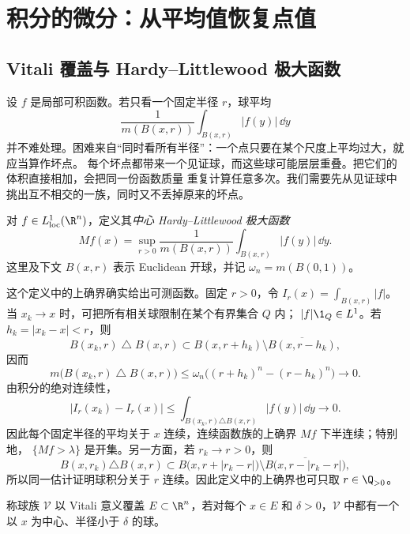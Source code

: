 \section{积分的微分：从平均值恢复点值}\label{sec:04-01}

\subsection{Vitali 覆盖与 Hardy--Littlewood 极大函数}\label{subsec:4-1-1}

设 $f$ 是局部可积函数。若只看一个固定半径 $r$，球平均
\[
  \frac{1}{m(B(x,r))}\int_{B(x,r)}|f(y)|\,\dd y
\]
并不难处理。困难来自“同时看所有半径”：一个点只要在某个尺度上平均过大，就应当算作坏点。
每个坏点都带来一个见证球，而这些球可能层层重叠。把它们的体积直接相加，会把同一份函数质量
重复计算任意多次。我们需要先从见证球中挑出互不相交的一族，同时又不丢掉原来的坏点。

\begin{definition}[中心极大函数]\label{def:4-1-1-1}
对 $f\in L^1_{\mathrm{loc}}(\R^n)$，定义其\emph{中心 Hardy--Littlewood 极大函数}
\[
  Mf(x)=\sup_{r>0}\frac{1}{m(B(x,r))}
                \int_{B(x,r)}|f(y)|\,\dd y .
\]
这里及下文 $B(x,r)$ 表示 Euclidean 开球，并记 $\omega_n=m(B(0,1))$。
\end{definition}

这个定义中的上确界确实给出可测函数。固定 $r>0$，令
$I_r(x)=\int_{B(x,r)}|f|$。当 $x_k\to x$ 时，可把所有相关球限制在某个有界集合 $Q$ 内；
$|f|\1_Q\in L^1$。若 $h_k=|x_k-x|<r$，则
\[
 B(x_k,r)\mathbin\triangle B(x,r)
 \subset B(x,r+h_k)\setminus\overline{B(x,r-h_k)},
\]
因而
\[
 m\bigl(B(x_k,r)\mathbin\triangle B(x,r)\bigr)
 \le \omega_n\bigl((r+h_k)^n-(r-h_k)^n\bigr)\longrightarrow0.
\]
由积分的绝对连续性，
\[
 |I_r(x_k)-I_r(x)|
 \le \int_{B(x_k,r)\triangle B(x,r)}|f(y)|\,\dd y\longrightarrow0.
\]
因此每个固定半径的平均关于 $x$ 连续，连续函数族的上确界 $Mf$ 下半连续；特别地，
$\{Mf>\lambda\}$ 是开集。另一方面，若 $r_k\to r>0$，则
\[
 B(x,r_k)\triangle B(x,r)
 \subset B\bigl(x,r+|r_k-r|\bigr)
       \setminus\overline{B\bigl(x,r-|r_k-r|\bigr)},
\]
所以同一估计证明球积分关于 $r$ 连续。因此定义中的上确界也可只取
$r\in\Q_{>0}$。

\begin{definition}[Vitali 球族]\label{def:4-1-1-2}
称球族 $\mathcal V$ 以 Vitali 意义覆盖 $E\subset\R^n$，若对每个 $x\in E$ 和
$\delta>0$，$\mathcal V$ 中都有一个以 $x$ 为中心、半径小于 $\delta$ 的球。
\end{definition}

